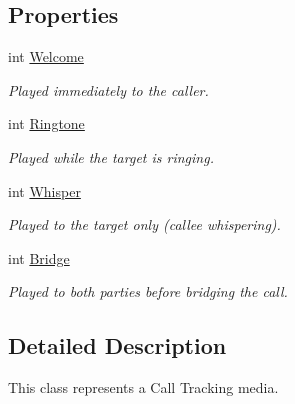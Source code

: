 \subsection*{Properties}
\begin{DoxyCompactItemize}
\item 
int \hyperlink{class_thecallr_api_1_1_objects_1_1_call_tracking_1_1_call_tracking_media_a53a06025c2b5d6b70e2008c5a6d6520a}{Welcome}
\begin{DoxyCompactList}\small\item\em Played immediately to the caller. \end{DoxyCompactList}\item 
int \hyperlink{class_thecallr_api_1_1_objects_1_1_call_tracking_1_1_call_tracking_media_a85afee9291532f02030e6e9f908a3d74}{Ringtone}
\begin{DoxyCompactList}\small\item\em Played while the target is ringing. \end{DoxyCompactList}\item 
int \hyperlink{class_thecallr_api_1_1_objects_1_1_call_tracking_1_1_call_tracking_media_af818e678277ab6ed9fc8db5f958b5afe}{Whisper}
\begin{DoxyCompactList}\small\item\em Played to the target only (callee whispering). \end{DoxyCompactList}\item 
int \hyperlink{class_thecallr_api_1_1_objects_1_1_call_tracking_1_1_call_tracking_media_a99c7ee76a0cca866e1d823ae51d51c70}{Bridge}
\begin{DoxyCompactList}\small\item\em Played to both parties before bridging the call. \end{DoxyCompactList}\end{DoxyCompactItemize}


\subsection{Detailed Description}
This class represents a Call Tracking media. 



